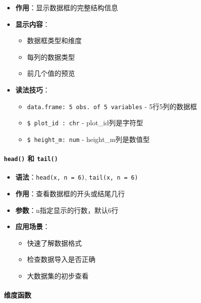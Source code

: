 \documentclass[
  twoside]{book}
\providecommand{\tightlist}{%
  \setlength{\itemsep}{0pt}\setlength{\parskip}{0pt}}
\begin{document}
\begin{itemize}
\tightlist
\item
  \textbf{作用}：显示数据框的完整结构信息
\item
  \textbf{显示内容}：

  \begin{itemize}
  \tightlist
  \item
    数据框类型和维度
  \item
    每列的数据类型
  \item
    前几个值的预览
  \end{itemize}
\item
  \textbf{读法技巧}：

  \begin{itemize}
  \tightlist
  \item
    \texttt{\textquotesingle{}data.frame\textquotesingle{}:\ 5\ obs.\ of\ 5\ variables} - 5行5列的数据框
  \item
    \texttt{\$\ plot\_id\ :\ chr} - plot\_id列是字符型
  \item
    \texttt{\$\ height\_m:\ num} - height\_m列是数值型
  \end{itemize}
\end{itemize}

\hypertarget{head-ux548c-tail}{%
\paragraph{\texorpdfstring{\texttt{head()} 和 \texttt{tail()}}{head() 和 tail()}}\label{head-ux548c-tail}}

\begin{itemize}
\tightlist
\item
  \textbf{语法}：\texttt{head(x,\ n\ =\ 6)}, \texttt{tail(x,\ n\ =\ 6)}
\item
  \textbf{作用}：查看数据框的开头或结尾几行
\item
  \textbf{参数}：n指定显示的行数，默认6行
\item
  \textbf{应用场景}：

  \begin{itemize}
  \tightlist
  \item
    快速了解数据格式
  \item
    检查数据导入是否正确
  \item
    大数据集的初步查看
  \end{itemize}
\end{itemize}

\hypertarget{ux7ef4ux5ea6ux51fdux6570}{%
\paragraph{维度函数}\label{ux7ef4ux5ea6ux51fdux6570}}
\end{document}
